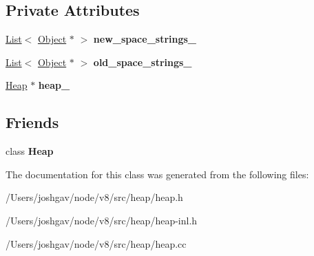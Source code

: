 \subsection*{Private Attributes}
\begin{DoxyCompactItemize}
\item 
\hyperlink{classv8_1_1internal_1_1_list}{List}$<$ \hyperlink{classv8_1_1internal_1_1_object}{Object} $\ast$ $>$ {\bfseries new\+\_\+space\+\_\+strings\+\_\+}\hypertarget{classv8_1_1internal_1_1_heap_1_1_external_string_table_a3b58513ddb25a08ee9fc83aaa7dc1892}{}\label{classv8_1_1internal_1_1_heap_1_1_external_string_table_a3b58513ddb25a08ee9fc83aaa7dc1892}

\item 
\hyperlink{classv8_1_1internal_1_1_list}{List}$<$ \hyperlink{classv8_1_1internal_1_1_object}{Object} $\ast$ $>$ {\bfseries old\+\_\+space\+\_\+strings\+\_\+}\hypertarget{classv8_1_1internal_1_1_heap_1_1_external_string_table_aaf591790c5a488b44c85d1c7595d8ecb}{}\label{classv8_1_1internal_1_1_heap_1_1_external_string_table_aaf591790c5a488b44c85d1c7595d8ecb}

\item 
\hyperlink{classv8_1_1internal_1_1_heap}{Heap} $\ast$ {\bfseries heap\+\_\+}\hypertarget{classv8_1_1internal_1_1_heap_1_1_external_string_table_ad8b064d16a1c83d0181693a8205244b4}{}\label{classv8_1_1internal_1_1_heap_1_1_external_string_table_ad8b064d16a1c83d0181693a8205244b4}

\end{DoxyCompactItemize}
\subsection*{Friends}
\begin{DoxyCompactItemize}
\item 
class {\bfseries Heap}\hypertarget{classv8_1_1internal_1_1_heap_1_1_external_string_table_a3d69975be2e998e7bf2dcd1b1c8b4577}{}\label{classv8_1_1internal_1_1_heap_1_1_external_string_table_a3d69975be2e998e7bf2dcd1b1c8b4577}

\end{DoxyCompactItemize}


The documentation for this class was generated from the following files\+:\begin{DoxyCompactItemize}
\item 
/\+Users/joshgav/node/v8/src/heap/heap.\+h\item 
/\+Users/joshgav/node/v8/src/heap/heap-\/inl.\+h\item 
/\+Users/joshgav/node/v8/src/heap/heap.\+cc\end{DoxyCompactItemize}
